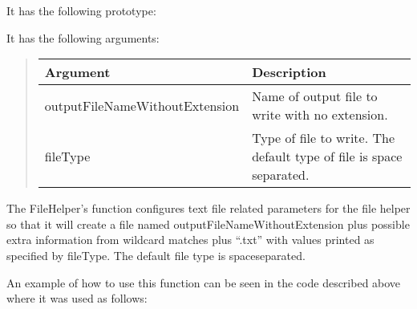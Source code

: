 \documentclass[letterpaper,10pt,english]{sphinxmanual}
\renewcommand{\sphinxcode}[1]{\texttt{\small{#1}}}
\begin{document}
It has the following prototype:

\begin{sphinxVerbatim}[commandchars=\\\{\}]
    
                        
\end{sphinxVerbatim}

It has the following arguments:
\begin{quote}


\begin{savenotes}\sphinxattablestart
\centering
\begin{tabulary}{\linewidth}[t]{|T|T|}
\hline
\sphinxstyletheadfamily 
Argument
&\sphinxstyletheadfamily 
Description
\\
\hline
outputFileNameWithoutExtension
&
Name of output file to write
with no extension.
\\
\hline
fileType
&
Type of file to write.  The
default type of file is space
separated.
\\
\hline
\end{tabulary}
\par
\sphinxattableend\end{savenotes}
\end{quote}

The FileHelper’s \sphinxcode{} function configures text file
related parameters for the file helper so that
it will create a file named outputFileNameWithoutExtension plus
possible extra information from wildcard matches plus “.txt” with
values printed as specified by fileType.  The default file type
is space\sphinxhyphen{}separated.

An example of how to use this function can be seen in the
\sphinxcode{} code described above where it was used as follows:

\begin{sphinxVerbatim}[commandchars=\\\{\}]
 
\end{sphinxVerbatim}
\end{document}
